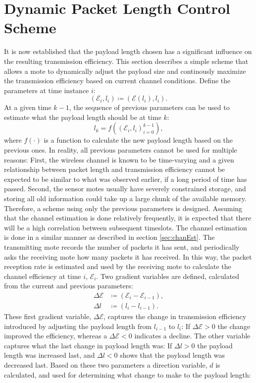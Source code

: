 \section{Dynamic Packet Length Control Scheme\label{sec:DPLC}}
It is now established that the payload length chosen has a significant influence on the resulting transmission efficiency. This section describes a simple scheme that allows a mote to dynamically adjust the payload size and continously maximize the transmission efficiency based on current channel conditions. Define the parameters at time instance $i$: 
\begin{equation}
(\mathcal{E}_i , l_i) \coloneqq (\mathcal{E}(l_i) , l_i).
\end{equation}
At a given time $k-1$, the sequence of previous parameters can be used to estimate what the payload length should be at time $k$:
\begin{equation}
l_k = f\left(
(\mathcal{E}_i , l_i )_{i=0}^{k-1}
\right),
\end{equation}
where $f(\cdot)$ is a function to calculate the new payload length based on the previous ones. In reality, all previous parameters cannot be used for multiple reasons: First, the wireless channel is known to be time-varying and a given relationship between packet length and transmission efficiency cannot be expected to be similar to what was observed earlier, if a long period of time has passed. Second, the sensor motes usually have severely constrained storage, and storing all old information could take up a large chunk of the available memory. Therefore, a scheme using only the previous parameters is designed. Assuming that the channel estimation is done relatively frequently, it is expected that there will be a high correlation between subsequent timeslots. The channel estimation is done in a similar manner as described in section \ref{sec:chanEst}. The transmitting mote records the number of packets it has sent, and periodically asks the receiving mote how many packets it has received. In this way, the packet reception rate is estimated and used by the receiving mote to calculate the channel efficiency at time $i$, $\mathcal{E}_i$. Two gradient variables are defined, calculated from the current and previous parameters:
\begin{align}
\Delta \mathcal{E} &\coloneqq (\mathcal{E}_i - \mathcal{E}_{i-1}),\\
\Delta l &\coloneqq (l_i - l_{i-1}).
\end{align}
These first gradient variable, $\Delta \mathcal{E}$, captures the change in transmission efficiency introduced by adjusting the payload length from $l_{i-1}$ to $l_{i}$: If $\Delta \mathcal{E} > 0$ the change improved the efficiency, whereas a $\Delta \mathcal{E} < 0$ indicates a decline. The other variable captures what the last change in payload length was: If $\Delta l > 0$ the payload length was increased last, and $\Delta l < 0$ shows that the payload length was decreased last. Based on these two parameters a direction variable, $d$ is calculated, and used for determining what change to make to the payload length:

